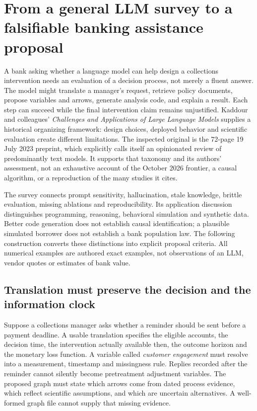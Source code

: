 \section{From a general LLM survey to a falsifiable banking assistance proposal}
\label{sec:exec24-llm-challenges}

A bank asking whether a language model can help design a collections intervention
needs an evaluation of a decision process, not merely a fluent answer. The model
might translate a manager's request, retrieve policy documents, propose variables
and arrows, generate analysis code, and explain a result. Each step can succeed
while the final intervention claim remains unjustified. Kaddour and colleagues'
\emph{Challenges and Applications of Large Language Models} supplies a historical
organizing framework: design choices, deployed behavior and scientific evaluation
create different limitations. The inspected original is the 72-page 19 July 2023
preprint, which explicitly calls itself an opinionated review of predominantly
text models. It supports that taxonomy and its authors' assessment, not an
exhaustive account of the October 2026 frontier, a causal algorithm, or a
reproduction of the many studies it cites.~\citep{exec24_llmchallenges_original}

The survey connects prompt sensitivity, hallucination, stale knowledge, brittle
evaluation, missing ablations and reproducibility. Its application discussion
distinguishes programming, reasoning, behavioral simulation and synthetic data.
Better code generation does not establish causal identification; a plausible
simulated borrower does not establish a bank population law. The following
construction converts these distinctions into explicit proposal criteria.
All numerical examples are authored exact examples, not observations of an LLM,
vendor quotes or estimates of bank value.~\citep{exec24_llmchallenges_reference}

\subsection{Translation must preserve the decision and the information clock}

Suppose a collections manager asks whether a reminder should be sent before a
payment deadline. A usable translation specifies the eligible accounts, the
decision time, the intervention actually available then, the outcome horizon
and the monetary loss function. A variable called \emph{customer engagement}
must resolve into a measurement, timestamp and missingness rule. Replies recorded
after the reminder cannot silently become pretreatment adjustment variables.
The proposed graph must state which arrows come from dated process evidence,
which reflect scientific assumptions, and which are uncertain alternatives.
A well-formed graph file cannot supply that missing evidence.

